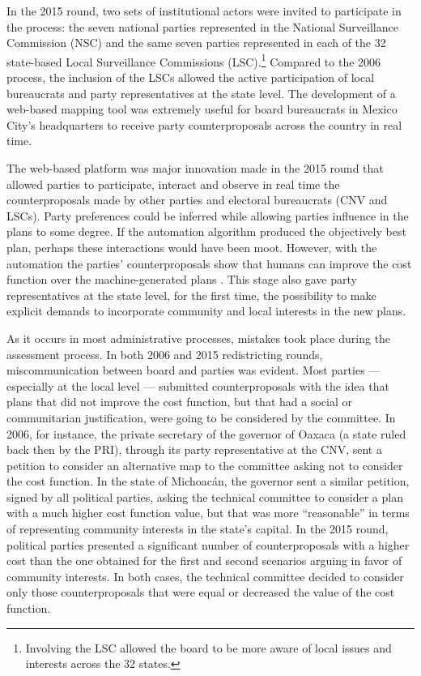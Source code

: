 \documentclass[letter,12pt]{article}
\begin{document}
In the 2015 round, two sets of institutional actors were invited to participate in the process: the seven national parties represented in the National Surveillance Commission (NSC) and the same seven parties represented in each of the 32 state-based Local Surveillance Commissions (LSC).\footnote{Involving the LSC allowed the board to be more aware of local issues and interests across the 32 states.} Compared to the 2006 process, the inclusion of the LSCs allowed the active participation of local bureaucrats and party representatives at the state level. The development of a web-based mapping tool was extremely useful for board bureaucrats in Mexico City's headquarters to receive party counterproposals across the country in real time.

The web-based platform was major innovation made in the 2015 round that allowed parties to participate, interact and observe in real time the counterproposals made by other parties and electoral bureaucrats (CNV and LSCs). Party preferences could be inferred while allowing parties influence in the plans to some degree. If the automation algorithm produced the objectively best plan, perhaps these interactions would have been moot. However, with the automation the parties' counterproposals show that humans can improve the cost function over the machine-generated plans \citep{altman.mcdonald2011bard}. This stage also gave party representatives at the state level, for the first time, the possibility to make explicit demands to incorporate community and local interests in the new plans.

As it occurs in most administrative processes, mistakes took place during the assessment process. In both 2006 and 2015 redistricting rounds, miscommunication between board and parties was evident. Most parties ---especially at the local level --- submitted counterproposals with the idea that plans that did not improve the cost function, but that had a social or communitarian justification, were going to be considered by the committee. In 2006, for instance, the private secretary of the governor of Oaxaca (a state ruled back then by the PRI), through its party representative at the CNV, sent a petition to consider an alternative map to the committee asking not to consider the cost function. In the state of Michoac\'an, the governor sent a similar petition, signed by all political parties, asking the technical committee to consider a plan with a much higher cost function value, but that was more ``reasonable'' in terms of representing community interests in the state's capital. In the 2015 round, political parties presented a significant number of counterproposals with a higher cost than the one obtained for the first and second scenarios arguing in favor of community interests. In both cases, the technical committee decided to consider only those counterproposals that were equal or decreased the value of the cost function.  
\end{document}
